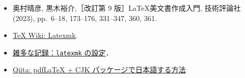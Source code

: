 




\begin{tcolorbox}[title={第~\ref{ch:howtouse}~章の参考文献}, colback=yellow!5!white, colframe=yellow!75!black, coltitle=black]
    \begin{itemize}
        \item 奥村晴彦, 黒木裕介,［改訂第 9 版］\LaTeX 美文書作成入門, 技術評論社 (2023), pp.~6--18, 173--176, 331--347, 360, 361.
        \item \href{https://texwiki.texjp.org/?Latexmk}{\TeX{} Wiki: Latexmk}.
        \item \href{https://www2.yukawa.kyoto-u.ac.jp/~koudai.sugimoto/dokuwiki/doku.php?id=latex:latexmk%E3%81%AE%E8%A8%AD%E5%AE%9A}{雑多な記録：\texttt{latexmk} の設定}．
        \item \href{https://qiita.com/zr_tex8r/items/cdaac1500718eb9fa330}{Qiita: pdfLaTeX + CJK パッケージで日本語する方法}
    \end{itemize}
\end{tcolorbox}


